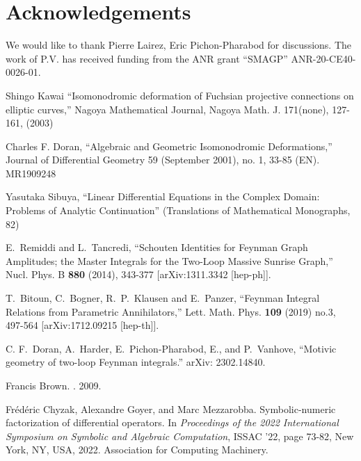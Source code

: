 \documentclass[a4paper,12pt]{article}
\numberwithin{equation}{section}
\numberwithin{figure}{subsection}
\theoremstyle{plain}
\theoremstyle{plain}
\theoremstyle{definition}
\theoremstyle{plain}
\theoremstyle{remark}
\theoremstyle{plain}
\begin{document}
\section*{Acknowledgements}
We would like to thank Pierre Lairez, Eric Pichon-Pharabod  for discussions.
The work of P.V. has received funding from the ANR grant ``SMAGP''
ANR-20-CE40-0026-01.

\begin{thebibliography}{99}

 Shingo Kawai ``Isomonodromic deformation of Fuchsian projective connections on elliptic curves,'' Nagoya Mathematical Journal, Nagoya Math. J. 171(none), 127-161, (2003)
  
 Charles F. Doran, ``Algebraic and Geometric Isomonodromic Deformations,'' Journal of Differential Geometry 59 (September 2001), no. 1, 33-85 (EN). MR1909248
   
   Yasutaka Sibuya, ``Linear Differential Equations in the Complex Domain: Problems of Analytic Continuation'' (Translations of Mathematical Monographs, 82)

E.~Remiddi and L.~Tancredi,
``Schouten Identities for Feynman Graph Amplitudes; the Master Integrals for the Two-Loop Massive Sunrise Graph,''
Nucl. Phys. B \textbf{880} (2014), 343-377
[arXiv:1311.3342 [hep-ph]].

  
T.~Bitoun, C.~Bogner, R.~P.~Klausen and E.~Panzer,
``Feynman Integral Relations from Parametric Annihilators,''
Lett. Math. Phys. \textbf{109} (2019) no.3, 497-564
[arXiv:1712.09215 [hep-th]].


   C. F.~Doran, A.~Harder, E.~Pichon-Pharabod, E., and P.~Vanhove,
 ``Motivic geometry of two-loop
Feynman integrals.'' arXiv: 2302.14840. 

Francis Brown.
.
 2009.
\newblock [arXiv:0910.0114]  

Fr\'{e}d\'{e}ric Chyzak, Alexandre Goyer, and Marc Mezzarobba.
\newblock Symbolic-numeric factorization of differential operators.
\newblock In {\em Proceedings of the 2022 International Symposium on Symbolic
  and Algebraic Computation}, ISSAC '22, page 73-82, New York, NY, USA, 2022.
Association for Computing Machinery.
\newblock [arXiv:2205.08991]


\end{thebibliography}
\end{document}
